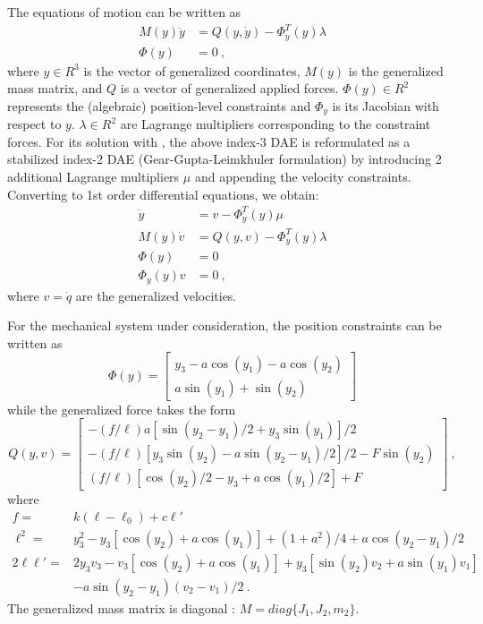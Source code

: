 The equations of motion can be written as
\begin{equation}
  \begin{split}
    M(y) \ddot y &= Q(y,\dot y) - \Phi_y^T(y) \lambda \\
    \Phi(y)     &= 0 ~,
  \end{split}
\end{equation}
where $y \in R^3$ is the vector of generalized coordinates, $M(y)$ is the generalized mass
matrix, and $Q$ is a vector of generalized applied forces. $\Phi(y) \in R^2$ represents the
(algebraic) position-level constraints and $\Phi_y$ is its Jacobian with respect to $y$.
$\lambda \in R^2$ are Lagrange multipliers corresponding to the constraint forces.
For its solution with {\idas}, the above index-3 DAE is reformulated as a stabilized 
index-2 DAE (Gear-Gupta-Leimkhuler formulation) by introducing 2 additional Lagrange 
multipliers $\mu$ and appending the velocity constraints.
Converting to 1st order differential equations, we obtain:
\begin{equation}\label{e:GGLform}
\begin{split}
  \dot y &= v - \Phi_y^T(y) \mu  \\
  M(y) \dot v &= Q(y,v) - \Phi_y^T(y) \lambda \\
  \Phi(y)     &= 0 \\
  \Phi_y(y) v &= 0 ~,
\end{split}
\end{equation}
where $v = \dot q$ are the generalized velocities.

For the mechanical system under consideration, the position constraints can be written as
\begin{equation}
  \Phi(y) = \begin{bmatrix}
    y_3 - a \cos(y_1) - a \cos(y_2) \\
    a \sin(y_1) + \sin(y_2)
  \end{bmatrix}
\end{equation}
while the generalized force takes the form
\begin{equation}
  Q(y, v) = \begin{bmatrix}
    - (f/\ell) a [\sin(y_2-y_1)/2 + y_3 \sin(y_1)]/2 \\
    - (f/\ell) [ y_3 \sin(y_2) - a \sin(y_2-y_1)/2]/2 - F \sin(y_2) \\
    (f/\ell) [\cos(y_2)/2 - y_3 + a \cos(y_1)/2 ] + F
  \end{bmatrix} ~,
\end{equation}
where
\begin{equation}
  \begin{split}
    f = & k (\ell - \ell_0) + c {\ell}' \\
    \ell^2 = & y_3^2 - y_3 [\cos(y_2) + a \cos(y_1)] + (1 + a^2)/4 + a \cos(y_2-y_1)/2 \\
    2 \ell {\ell}' = & 2 y_3 v_3 - v_3 [\cos(y_2) + a \cos(y_1)] + y_3 [\sin(y_2)v_2 + a\sin(y_1)v_1] \\
    & - a \sin(y_2-y_1) (v_2-v_1)/2 ~.
  \end{split}
\end{equation}
The generalized mass matrix is diagonal : $M = diag \{J_1, J_2, m_2\}$.


